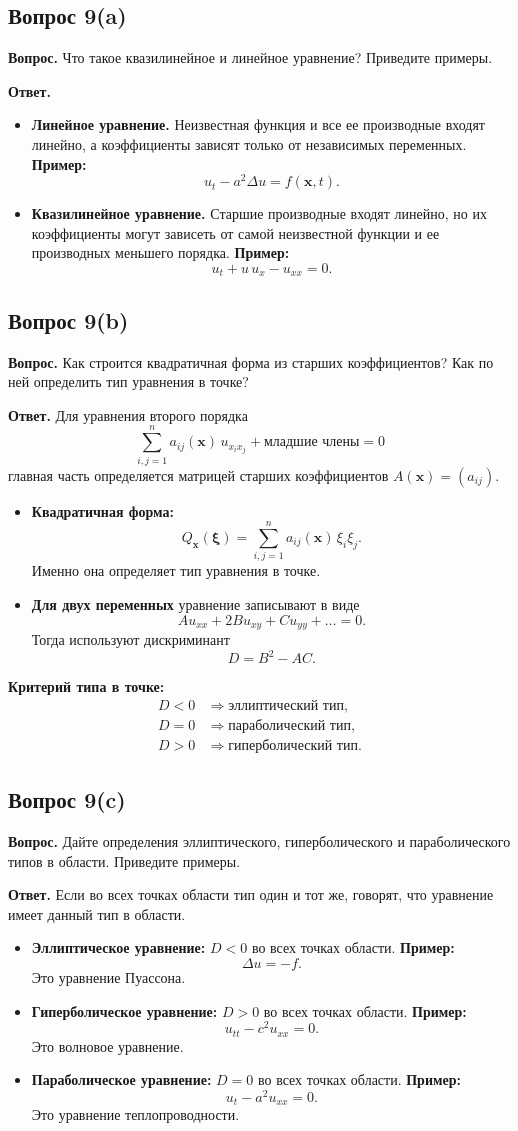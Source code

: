 \documentclass[a4paper,12pt]{article}
\newcommand{\Question}[2]{\subsection*{Вопрос #1}\textbf{Вопрос.} #2}
\newcommand{\Answer}{\textbf{Ответ.}}
\begin{document}
\Question{9(a)}{Что такое квазилинейное и линейное уравнение? Приведите примеры.}

\Answer
\begin{itemize}
  \item \textbf{Линейное уравнение.} Неизвестная функция и все ее производные входят линейно, а коэффициенты зависят только от независимых переменных.  
  \textbf{Пример:}
  \[
  u_t-a^2\Delta u=f(\mathbf{x},t).
  \]

  \item \textbf{Квазилинейное уравнение.} Старшие производные входят линейно, но их коэффициенты могут зависеть от самой неизвестной функции и ее производных меньшего порядка.  
  \textbf{Пример:}
  \[
  u_t+u\,u_x-u_{xx}=0.
  \]
\end{itemize}

\Question{9(b)}{Как строится квадратичная форма из старших коэффициентов? Как по ней определить тип уравнения в точке?}

\Answer
Для уравнения второго порядка
\[
\sum_{i,j=1}^{n}a_{ij}(\mathbf{x})\,u_{x_ix_j}+\text{младшие члены}=0
\]
главная часть определяется матрицей старших коэффициентов $A(\mathbf{x})=(a_{ij})$.

\begin{itemize}
  \item \textbf{Квадратичная форма:}
  \[
  Q_{\mathbf{x}}(\boldsymbol{\xi})=
  \sum_{i,j=1}^{n}a_{ij}(\mathbf{x})\,\xi_i\xi_j.
  \]
  Именно она определяет тип уравнения в точке.

  \item \textbf{Для двух переменных} уравнение записывают в виде
  \[
  Au_{xx}+2Bu_{xy}+Cu_{yy}+\dots=0.
  \]
  Тогда используют дискриминант
  \[
  D=B^2-AC.
  \]
\end{itemize}

\textbf{Критерий типа в точке:}
\[
\begin{aligned}
D<0 &\Rightarrow \text{эллиптический тип},\\
D=0 &\Rightarrow \text{параболический тип},\\
D>0 &\Rightarrow \text{гиперболический тип}.
\end{aligned}
\]

\Question{9(c)}{Дайте определения эллиптического, гиперболического и параболического типов в области. Приведите примеры.}

\Answer
Если во всех точках области тип один и тот же, говорят, что уравнение имеет данный тип в области.

\begin{itemize}
  \item \textbf{Эллиптическое уравнение:} $D<0$ во всех точках области.  
  \textbf{Пример:}
  \[
  \Delta u=-f.
  \]
  Это уравнение Пуассона.

  \item \textbf{Гиперболическое уравнение:} $D>0$ во всех точках области.  
  \textbf{Пример:}
  \[
  u_{tt}-c^2u_{xx}=0.
  \]
  Это волновое уравнение.

  \item \textbf{Параболическое уравнение:} $D=0$ во всех точках области.  
  \textbf{Пример:}
  \[
  u_t-a^2u_{xx}=0.
  \]
  Это уравнение теплопроводности.
\end{itemize}
\end{document}
